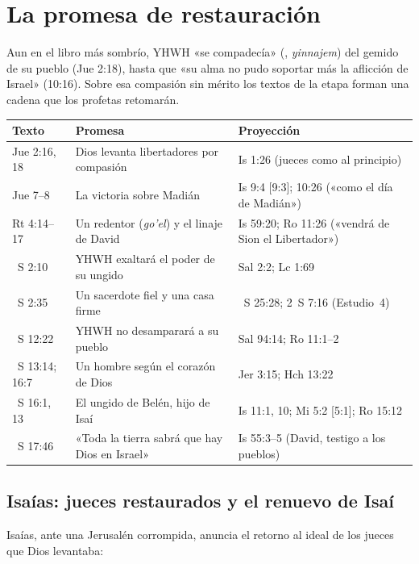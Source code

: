 \section{La promesa de restauración}

Aun en el libro más sombrío, YHWH «se compadecía» (, \emph{yinnajem}) del gemido de su pueblo (Jue 2:18), hasta que «su alma no pudo soportar más la aflicción de Israel» (10:16). Sobre esa compasión sin mérito los textos de la etapa forman una cadena que los profetas retomarán.

\begin{center}\small
\renewcommand{\arraystretch}{1.25}
\begin{tabular}{>{\RaggedRight\arraybackslash}p{2.6cm}>{\RaggedRight\arraybackslash}p{5.0cm}>{\RaggedRight\arraybackslash}p{6.3cm}}
\toprule
\textbf{Texto} & \textbf{Promesa} & \textbf{Proyección}\\
\midrule
Jue 2:16, 18 & Dios levanta libertadores por compasión & Is 1:26 (jueces como al principio)\\
Jue 7--8 & La victoria sobre Madián & Is 9:4 [9:3]; 10:26 («como el día de Madián»)\\
Rt 4:14--17 & Un redentor (\emph{go'el}) y el linaje de David & Is 59:20; Ro 11:26 («vendrá de Sion el Libertador»)\\
1~S 2:10 & YHWH exaltará el poder de su ungido & Sal 2:2; Lc 1:69\\
1~S 2:35 & Un sacerdote fiel y una casa firme & 1~S 25:28; 2~S 7:16 (Estudio~4)\\
1~S 12:22 & YHWH no desamparará a su pueblo & Sal 94:14; Ro 11:1--2\\
1~S 13:14; 16:7 & Un hombre según el corazón de Dios & Jer 3:15; Hch 13:22\\
1~S 16:1, 13 & El ungido de Belén, hijo de Isaí & Is 11:1, 10; Mi 5:2 [5:1]; Ro 15:12\\
1~S 17:46 & «Toda la tierra sabrá que hay Dios en Israel» & Is 55:3--5 (David, testigo a los pueblos)\\
\bottomrule
\end{tabular}\end{center}

\subsection{Isaías: jueces restaurados y el renuevo de Isaí}
Isaías, ante una Jerusalén corrompida, anuncia el retorno al ideal de los jueces que Dios levantaba:

